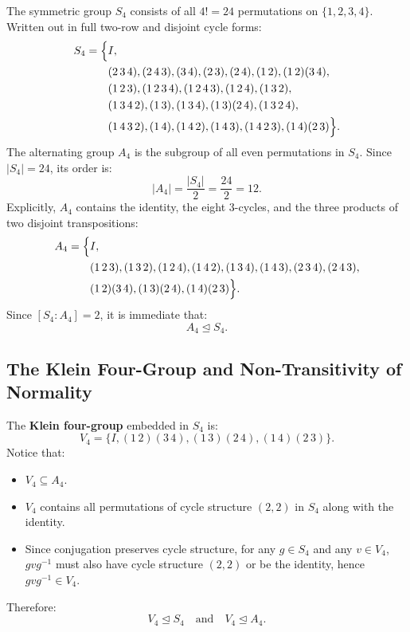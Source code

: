 \documentclass[12pt]{article}
\theoremstyle{definition}
\theoremstyle{plain}
\begin{document}
The symmetric group $S_4$ consists of all $4! = 24$ permutations on $\{1, 2, 3, 4\}$. Written out in full two-row and disjoint cycle forms:
\begin{align*}
S_4 = \Bigl\{
& I, \\
& (2\,3\,4), (2\,4\,3), (3\,4), (2\,3), (2\,4), (1\,2), (1\,2)(3\,4), \\
& (1\,2\,3), (1\,2\,3\,4), (1\,2\,4\,3), (1\,2\,4), (1\,3\,2), \\
& (1\,3\,4\,2), (1\,3), (1\,3\,4), (1\,3)(2\,4), (1\,3\,2\,4), \\
& (1\,4\,3\,2), (1\,4), (1\,4\,2), (1\,4\,3), (1\,4\,2\,3), (1\,4)(2\,3)
\Bigr\}.
\end{align*}
The alternating group $A_4$ is the subgroup of all even permutations in $S_4$. Since $|S_4| = 24$, its order is:
\[
|A_4| = \frac{|S_4|}{2} = \frac{24}{2} = 12.
\]
Explicitly, $A_4$ contains the identity, the eight 3-cycles, and the three products of two disjoint transpositions:
\begin{align*}
A_4 = \Bigl\{
& I, \\
& (1\,2\,3), (1\,3\,2), (1\,2\,4), (1\,4\,2), (1\,3\,4), (1\,4\,3), (2\,3\,4), (2\,4\,3), \\
& (1\,2)(3\,4), (1\,3)(2\,4), (1\,4)(2\,3)
\Bigr\}.
\end{align*}
Since $[S_4 : A_4] = 2$, it is immediate that:
\[
A_4 \trianglelefteq S_4.
\]

\subsection{The Klein Four-Group and Non-Transitivity of Normality}
\label{sec:counterexample_transitivity}

The \textbf{Klein four-group} embedded in $S_4$ is:
\[
V_4 = \{ I, (1\,2)(3\,4), (1\,3)(2\,4), (1\,4)(2\,3) \}.
\]
Notice that:
\begin{itemize}
    \item $V_4 \subseteq A_4$.
    \item $V_4$ contains all permutations of cycle structure $(2, 2)$ in $S_4$ along with the identity.
    \item Since conjugation preserves cycle structure, for any $g \in S_4$ and any $v \in V_4$, $g v g^{-1}$ must also have cycle structure $(2, 2)$ or be the identity, hence $g v g^{-1} \in V_4$.
\end{itemize}
Therefore:
\[
V_4 \trianglelefteq S_4 \quad \text{and} \quad V_4 \trianglelefteq A_4.
\]
\end{document}
